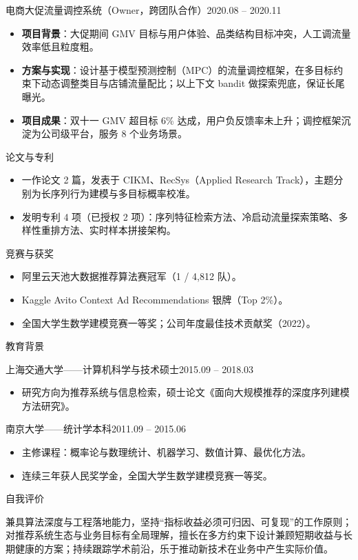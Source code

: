 \documentclass[10.5pt,fontset=windows]{ctexart}
\newcommand{\rsection}[1]{%
  \Needspace*{6\baselineskip}%
  \vspace{9pt}%
  {\color{maincolor}\heiti\zihao{4}#1}\par
  \vspace{1pt}{\color{maincolor}\rule{\textwidth}{1pt}}\par
  \vspace{3pt}}
\newcommand{\entryhead}[2]{%
  \Needspace*{3\baselineskip}%
  {\heiti #1}\hfill{\color{graytext}\small #2}\par\vspace{1pt}}
\newcommand{\subhead}[2]{%
  {\heiti #1}\hfill{\color{graytext}\small #2}\par\vspace{1pt}}
\begin{document}
\entryhead{电商大促流量调控系统（Owner，跨团队合作）}{2020.08 -- 2020.11}
\begin{itemize}
  \item \textbf{项目背景}：大促期间 GMV 目标与用户体验、品类结构目标冲突，人工调流量效率低且粒度粗。
  \item \textbf{方案与实现}：设计基于模型预测控制（MPC）的流量调控框架，在多目标约束下动态调整类目与店铺流量配比；以上下文 bandit 做探索兜底，保证长尾曝光。
  \item \textbf{项目成果}：双十一 GMV 超目标 6\% 达成，用户负反馈率未上升；调控框架沉淀为公司级平台，服务 8 个业务场景。
\end{itemize}

\rsection{论文与专利}
\begin{itemize}
  \item 一作论文 2 篇，发表于 CIKM、RecSys（Applied Research Track），主题分别为长序列行为建模与多目标概率校准。
  \item 发明专利 4 项（已授权 2 项）：序列特征检索方法、冷启动流量探索策略、多样性重排方法、实时样本拼接架构。
\end{itemize}

\rsection{竞赛与获奖}
\begin{itemize}
  \item 阿里云天池大数据推荐算法赛冠军（1 / 4,812 队）。
  \item Kaggle Avito Context Ad Recommendations 银牌（Top 2\%）。
  \item 全国大学生数学建模竞赛一等奖；公司年度最佳技术贡献奖（2022）。
\end{itemize}

\rsection{教育背景}
\subhead{上海交通大学\quad ——\quad 计算机科学与技术\quad 硕士}{2015.09 -- 2018.03}
\begin{itemize}
  \item 研究方向为推荐系统与信息检索，硕士论文《面向大规模推荐的深度序列建模方法研究》。
\end{itemize}
\subhead{南京大学\quad ——\quad 统计学\quad 本科}{2011.09 -- 2015.06}
\begin{itemize}
  \item 主修课程：概率论与数理统计、机器学习、数值计算、最优化方法。
  \item 连续三年获人民奖学金，全国大学生数学建模竞赛一等奖。
\end{itemize}

\rsection{自我评价}
兼具算法深度与工程落地能力，坚持“指标收益必须可归因、可复现”的工作原则；对推荐系统生态与业务目标有全局理解，擅长在多方约束下设计兼顾短期收益与长期健康的方案；持续跟踪学术前沿，乐于推动新技术在业务中产生实际价值。
\end{document}
